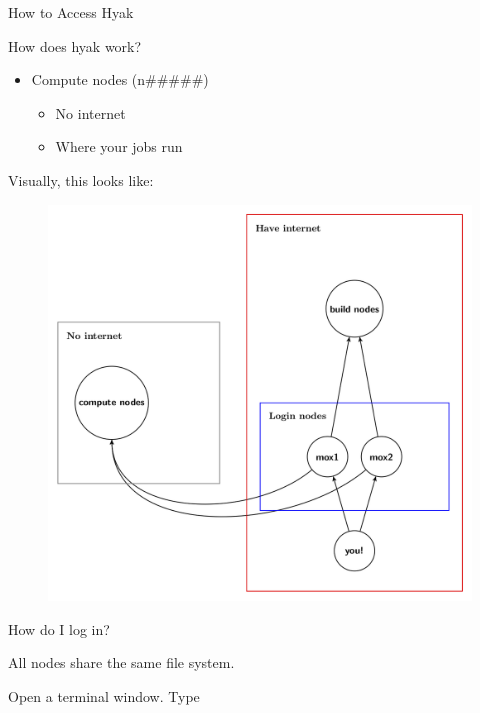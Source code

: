 \documentclass[ignorenonframetext,]{beamer}
\providecommand{\tightlist}{%
  \setlength{\itemsep}{0pt}\setlength{\parskip}{0pt}}
\begin{document}
\begin{frame}[fragile]{How to Access Hyak}
\begin{block}{How does hyak work?}
\begin{itemize}[<+->]
  \begin{itemize}[<+->]
  \tightlist
  \item
    Have internet
  \item
    Don't get to take a whole node (so also kinda slow)
  \item
    Just for compiling software
  \end{itemize}
\item
  Compute nodes (n\#\#\#\#\#)

  \begin{itemize}[<+->]
  \tightlist
  \item
    No internet
  \item
    Where your jobs run
  \end{itemize}
\end{itemize}

Visually, this looks like:

\begin{figure}
\centering
\includegraphics[width=5.20833in]{images/Hyak_architecture.png}
\caption{}
\end{figure}

\end{block}

\begin{block}{How do I log in?}

All nodes share the same file system.

Open a terminal window. Type


\end{block}
\end{frame}
\end{document}
